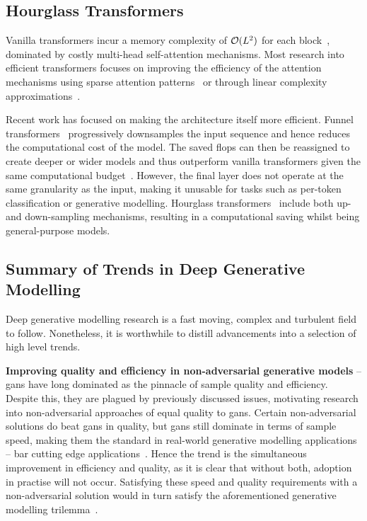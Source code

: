 \subsection{Hourglass Transformers}
\label{subsec:hourglass}

Vanilla transformers incur a memory complexity of $\mathcal{O}(L^2)$ for each
block~\cite{vaswani2017attention}, dominated by costly multi-head self-attention
mechanisms. Most research into efficient transformers focuses on improving the
efficiency of the attention mechanisms using sparse attention
patterns~\cite{child2019generating} or through linear complexity
approximations~\cite{xiong2021nystromformer}.

Recent work has focused on making the architecture itself more efficient. Funnel
transformers~\cite{dai2020funneltransformer} progressively downsamples the input
sequence and hence reduces the computational cost of the model. The saved
\glspl{flop} can then be reassigned to create deeper or wider models and thus
outperform vanilla transformers given the same computational
budget~\cite{dai2020funneltransformer}. However, the final layer does not
operate at the same granularity as the input, making it unusable for tasks such
as per-token classification or generative modelling. Hourglass
transformers~\cite{nawrot2021hierarchical} include both up- and down-sampling
mechanisms, resulting in a computational saving whilst being general-purpose
models.

\subsection{Summary of Trends in Deep Generative Modelling}
\label{subsec:trends}

Deep generative modelling research is a fast moving, complex and turbulent field
to follow. Nonetheless, it is worthwhile to distill advancements into a
selection of high level trends.

\textbf{Improving quality and efficiency in non-adversarial generative models} -- 
\Glspl{gan} have long dominated as the pinnacle of sample quality and
efficiency. Despite this, they are plagued by previously discussed issues,
motivating research into non-adversarial approaches of equal quality to
\glspl{gan}. Certain non-adversarial solutions do beat \glspl{gan} in quality,
but \glspl{gan} still dominate in terms of sample speed, making them the
standard in real-world generative modelling applications -- bar cutting
edge applications~\cite{ramesh2021dalle,ramesh2022dalle2}. Hence the trend is
the simultaneous improvement in efficiency and quality, as it is clear that
without both, adoption in practise will not occur. Satisfying these speed and
quality requirements with a non-adversarial solution would in turn satisfy the
aforementioned generative modelling trilemma~\cite{xiao2021trilemma}.

